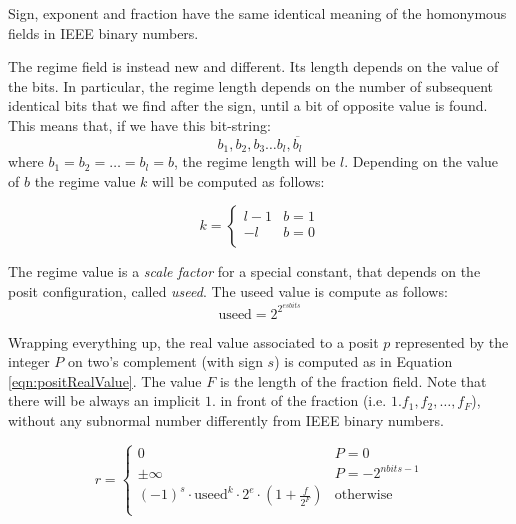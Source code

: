 Sign, exponent and fraction have the same identical meaning of the homonymous fields in IEEE binary numbers. 

The regime field is instead new and different. Its length depends on the value of the bits. In particular, the regime length depends on the number of subsequent identical bits that we find after the sign, until a bit of opposite value is found. This means that, if we have this bit-string:
\begin{equation}
    b_1, b_2, b_3 \dots b_l, \overline{b_{l}}
\end{equation}
 where $b_1 = b_2 = \dots = b_l = b$, the regime length will be $l$. Depending on the value of $b$ the regime value $k$ will be computed as follows:
 
\begin{equation}\label{eqn:regimeValue}
k = \left\{\begin{matrix}
 l-1& b = 1  \\
 -l & b = 0  \\
\end{matrix}\right.
\end{equation}

The regime value is a \textit{scale factor} for a special constant, that depends on the posit configuration, called \textit{useed}. The useed value is compute as follows:
\begin{equation}\label{eqn:useed}
    \text{useed} = 2^{2^{esbits}}
\end{equation}

Wrapping everything up, the real value associated to a posit $p$ represented by the integer $P$ on two's complement (with sign $s$) is computed as in Equation \eqref{eqn:positRealValue}. The value $F$ is the length of the fraction field. Note that there will be always an implicit $1.$ in front of the fraction (i.e. $1.f_1,f_2, \dots, f_F$), without any subnormal number differently from IEEE binary numbers.

\begin{equation}\label{eqn:positRealValue}
 r =   \left\{\begin{matrix}
0 & P = 0  \\
\pm \infty & P = -2^{nbits-1}  \\
(-1)^s \cdot \text{useed}^{k} \cdot 2^e \cdot \left ( 1+ \frac{f}{2^F} \right) &  \text{otherwise} \\
\end{matrix}\right.
\end{equation}



